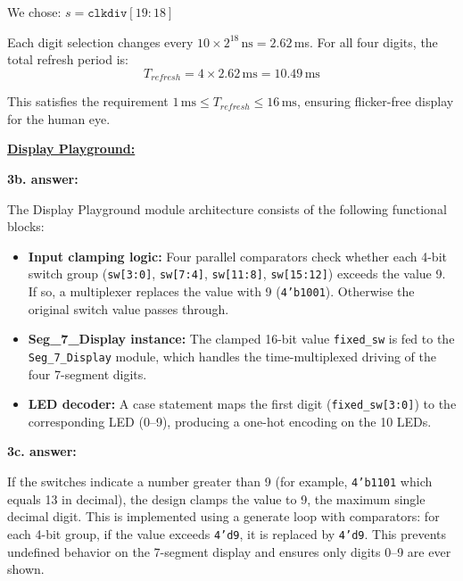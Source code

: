 \documentclass[11pt]{article}
\newcommand{\templatesubsection}[1]{%
  \textbf{\underline{#1}}
}
\begin{document}
We chose: $s = \texttt{clkdiv}[19:18]$

Each digit selection changes every $10 \times 2^{18}\,\text{ns} = 2.62$\,ms. For all four digits, the total refresh period is:
\[
T_{refresh} = 4 \times 2.62\,\text{ms} = 10.49\,\text{ms}
\]

This satisfies the requirement $1\,\text{ms} \leq T_{refresh} \leq 16\,\text{ms}$, ensuring flicker-free display for the human eye.

\vspace{12pt}


\templatesubsection{Display Playground:}

\vspace{6pt}

\textbf{3b. answer:}

The Display Playground module architecture consists of the following functional blocks:

\begin{itemize}[nosep]
    \item \textbf{Input clamping logic:} Four parallel comparators check whether each 4-bit switch group (\texttt{sw[3:0]}, \texttt{sw[7:4]}, \texttt{sw[11:8]}, \texttt{sw[15:12]}) exceeds the value 9. If so, a multiplexer replaces the value with 9 (\texttt{4'b1001}). Otherwise the original switch value passes through.
    \item \textbf{Seg\_7\_Display instance:} The clamped 16-bit value \texttt{fixed\_sw} is fed to the \texttt{Seg\_7\_Display} module, which handles the time-multiplexed driving of the four 7-segment digits.
    \item \textbf{LED decoder:} A case statement maps the first digit (\texttt{fixed\_sw[3:0]}) to the corresponding LED (0--9), producing a one-hot encoding on the 10 LEDs.
\end{itemize}

\vspace{6pt}

\textbf{3c. answer:}

If the switches indicate a number greater than 9 (for example, \texttt{4'b1101} which equals 13 in decimal), the design clamps the value to 9, the maximum single decimal digit. This is implemented using a generate loop with comparators: for each 4-bit group, if the value exceeds \texttt{4'd9}, it is replaced by \texttt{4'd9}. This prevents undefined behavior on the 7-segment display and ensures only digits 0--9 are ever shown.
\end{document}
